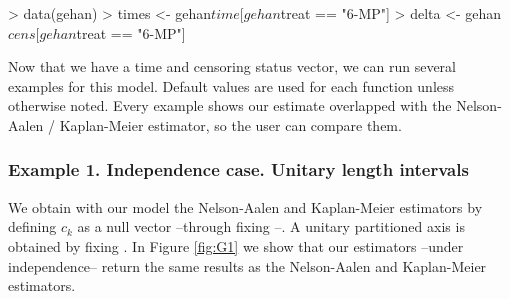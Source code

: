 \documentclass[letterpaper]{article}
\begin{document}
\begin{Schunk}
\begin{Sinput}
> data(gehan)
> times <- gehan$time[gehan$treat == "6-MP"]
> delta <- gehan$cens[gehan$treat == "6-MP"]
\end{Sinput}
\end{Schunk}

Now that we have a time and censoring status vector, we can run several examples for this model. Default values are used for each function unless otherwise noted. Every example shows our estimate overlapped with the Nelson-Aalen / Kaplan-Meier estimator, so the user can compare them.

\subsubsection{Example 1. Independence case. Unitary length intervals}

We obtain with our model the Nelson-Aalen and Kaplan-Meier estimators by defining $c_k$ as a null vector --through fixing --. A unitary partitioned axis is obtained by fixing . In Figure \ref{fig:G1} we show that our estimators --under independence-- return the same results as the Nelson-Aalen and Kaplan-Meier estimators.
\end{document}
